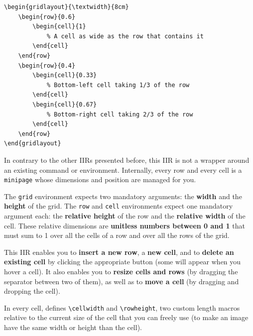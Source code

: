 \documentclass[11pt, a4paper]{article}
\begin{document}
\begin{lstlisting}[style=custom-latex]
% this grid is as wide as the text (\textwidth) and 8cm tall
\begin{gridlayout}{\textwidth}{8cm}
    \begin{row}{0.6}
        \begin{cell}{1}
            % A cell as wide as the row that contains it
        \end{cell}
    \end{row}
    \begin{row}{0.4}
        \begin{cell}{0.33}
            % Bottom-left cell taking 1/3 of the row
        \end{cell}
        \begin{cell}{0.67}
            % Bottom-right cell taking 2/3 of the row
        \end{cell}
    \end{row}
\end{gridlayout}
\end{lstlisting}

In contrary to the other IIRs presented before, this IIR is not a wrapper around an existing command or environment.
Internally, every row and every cell is a \texttt{minipage} whose dimensions and position are managed for you.

The \texttt{grid} environment expects two mandatory arguments: the \textbf{width} and the \textbf{height} of the grid.
The \texttt{row} and \texttt{cell} environments expect one mandatory argument each: the \textbf{relative height} of the row and the \textbf{relative width} of the cell. These relative dimensions are \textbf{unitless numbers between 0 and 1} that must sum to 1 over all the cells of a row and over all the rows of the grid.

This IIR enables you to \textbf{insert a new row}, a \textbf{new cell}, and to \textbf{delete an existing cell} by clicking the appropriate button (some will appear when you hover a cell). It also enables you to \textbf{resize cells and rows} (by dragging the separator between two of them), as well as to \textbf{move a cell} (by dragging and dropping the cell).

\begin{info}
    In every cell, \iLaTeX{} defines \verb|\cellwidth| and \verb|\rowheight|, two custom length macros relative to the current size of the cell that you can freely use (\eg to make an image have the same width or height than the cell).
\end{info}
\end{document}
